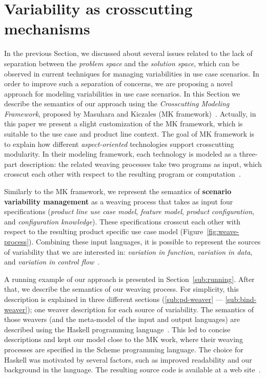 



\section{Variability as crosscutting mechanisms}
\label{sec:models}

In the previous Section, we discussed about several issues related to the lack of
separation between the \emph{problem space} and the \emph{solution space}, which
can be observed in current techniques for managing variabilities in use case
scenarios. In order to improve such a separation of concerns, we are proposing a
novel approach for modeling variabilities in use case scenarios. In this Section
we describe the semantics of our approach using the \emph{Crosscutting Modeling
Framework}, proposed by Masuhara and Kiczales (MK
framework)~\cite{Masuhara:2003aa}. Actually, in this paper we present a slight
customization of the MK framework, which is suitable to the use case and product
line context. The goal of MK framework is to explain how different
\emph{aspect-oriented} technologies support crosscutting modularity. In their
modeling framework, each technology is modeled as a three-part description: the
related weaving processes take two programs as input, which crosscut each other
with respect to the resulting program or computation~\cite{Masuhara:2003aa}.

Similarly to the MK framework, we represent the semantics of \textbf{scenario
variability management} as a weaving process that takes as input four
specifications (\emph{product line use case model}, \emph{feature model}, \emph{product
configuration}, and \emph{configuration knowledge}). These
specifications crosscut each other with respect to the resulting product
specific use case model (Figure~\ref{fig:weave-process}).
Combining these input languages, it is possible
to represent the sources of variability that we are interested in:
\emph{variation in function}, \emph{variation in data}, and
\emph{variation in control flow}~\cite{Bachmann:2001aa}.

A running example of our approach is presented in Section~\ref{sub:running}.
After that, we describe the semantics of our weaving process. For simplicity,
this description is explained in three different sections (\ref{sub:pd-weaver}
--- \ref{sub:bind-weaver}); one weaver description for each source of
variability. The semantics of those weavers (and the meta-model of the input and
output languages) are described using the Haskell programming
language~\cite{Jones:2002aa}. This led to concise descriptions and kept our model
close to the MK work, where their weaving processes are specified in the Scheme
programming language. The choice for Haskell was motivated by several factors,
such as improved readability and our background in the language. The resulting
source code is available at a web site~\cite{spg-url}.

